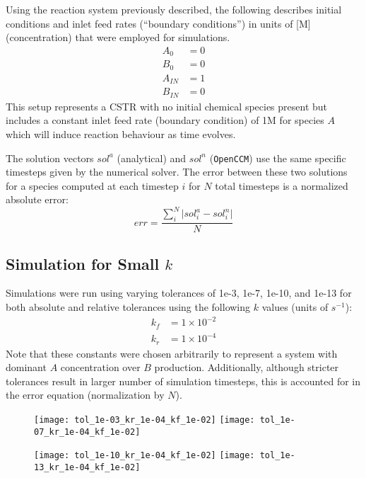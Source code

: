 \documentclass[a4paper,12pt]{article}
\begin{document}
Using the reaction system previously described, the following describes initial conditions and inlet feed rates (``boundary conditions'') in units of [M] (concentration) that were employed for simulations. 
\begin{align}
	A_{0} &= 0\\
    B_{0} &= 0\\
	A_{IN} &= 1\\
    B_{IN} &= 0
\end{align}
This setup represents a CSTR with no initial chemical species present but includes a constant inlet feed rate (boundary condition) of 1M for species $A$ which will induce reaction behaviour as time evolves. 

The solution vectors $sol^a$ (analytical) and $sol^n$ (\texttt{OpenCCM}) use the same specific timesteps given by the numerical solver.
The error between these two solutions for a species computed at each timestep $i$ for $N$ total timesteps is a normalized absolute error:
\begin{equation}
	err = \frac{\sum_i^N \lvert sol^a_i - sol^n_i \rvert}{N}
\end{equation}


\subsection{Simulation for Small $k$}

Simulations were run using varying tolerances of 1e-3, 1e-7, 1e-10, and 1e-13 for both absolute and relative tolerances using the following $k$ values (units of $s^{-1}$):
\begin{align}
    k_f &= 1 \times 10^{-2}\\
    k_r &= 1 \times 10^{-4}
\end{align}
Note that these constants were chosen arbitrarily to represent a system with dominant $A$ concentration over $B$ production. 
Additionally, although stricter tolerances result in larger number of simulation timesteps, this is accounted for in the error equation (normalization by $N$).
\begin{figure}[H]
    \texttt{[image: tol\_1e-03\_kr\_1e-04\_kf\_1e-02]}\hfill
    \texttt{[image: tol\_1e-07\_kr\_1e-04\_kf\_1e-02]}
\end{figure}
\begin{figure}[H]
    \texttt{[image: tol\_1e-10\_kr\_1e-04\_kf\_1e-02]}\hfill
    \texttt{[image: tol\_1e-13\_kr\_1e-04\_kf\_1e-02]}
\end{figure}
\end{document}
